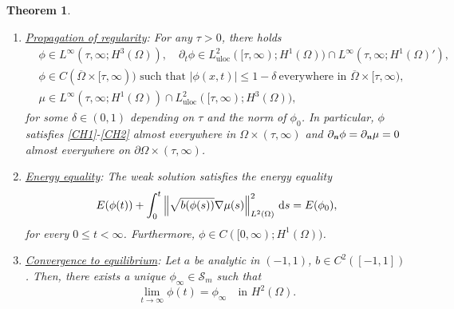 \documentclass[11pt,reqno]{amsart}
\newtheorem{theorem}{Theorem}[section]
\theoremstyle{remark}
\def\n{\textbf{\textit{n}}}
\def\d{{\rm d}}
\def\uu{\boldsymbol{u}}
\numberwithin{equation}{section}
\def\d{{\rm d}}
\newcommand{\uloc}{\operatorname{uloc}}
\begin{document}
\begin{theorem}
\begin{enumerate}

\item \underline{Propagation of regularity}: For any $\tau>0$, there holds
\begin{align}
\label{RS1}
& \phi \in L^\infty(\tau, \infty; H^3(\Omega)), \quad \partial_t \phi \in L_{\uloc}^2([\tau,\infty);H^1(\Omega))\cap L^\infty(\tau,\infty; H^1(\Omega)'),
\\
\label{RS2}
& \phi \in C(\overline{\Omega} \times [\tau, \infty)) \text{ such that }  |\phi(x,t)|\leq 1-\delta  \ \text{everywhere in } \overline{\Omega}\times [\tau,\infty),
\\
\label{RS3}
&\mu \in L^{\infty}(\tau,\infty; H^1(\Omega))\cap L_{\uloc}^2([\tau,\infty);H^3(\Omega)),
\end{align}
for some $\delta \in (0,1)$ depending on $\tau$ and the norm of $\phi_0$.
In particular, $\phi$ satisfies \eqref{CH1}-\eqref{CH2} almost everywhere in $\Omega \times (\tau,\infty)$ and  $\partial_\n \phi=\partial_\n \mu=0$ almost everywhere on $\partial\Omega\times(\tau,\infty)$.
\medskip

\item \underline{Energy equality}:
The weak solution satisfies the energy equality
\begin{equation}
\label{EI}
E(\phi(t))+ \int_0^t 
\left\| \sqrt{b(\phi(s))} \nabla \mu(s)\right\|_{L^2(\Omega)}^2 \, \d s =  E (\phi_0),
\end{equation}
for every $0\leq t < \infty$. Furthermore, $\phi \in C([0,\infty); H^1(\Omega))$.
\medskip

\item \underline{Convergence to equilibrium}: Let $a$ be analytic in $(-1,1)$, $b \in C^2([-1,1])$. Then, there exists a unique $\phi_\infty \in \mathcal{S}_m$ such that
$$\lim_{t\to\infty}\phi(t)=\phi_\infty\quad \text{in } H^2(\Omega).$$
\end{enumerate}
\end{theorem}
\end{document}
